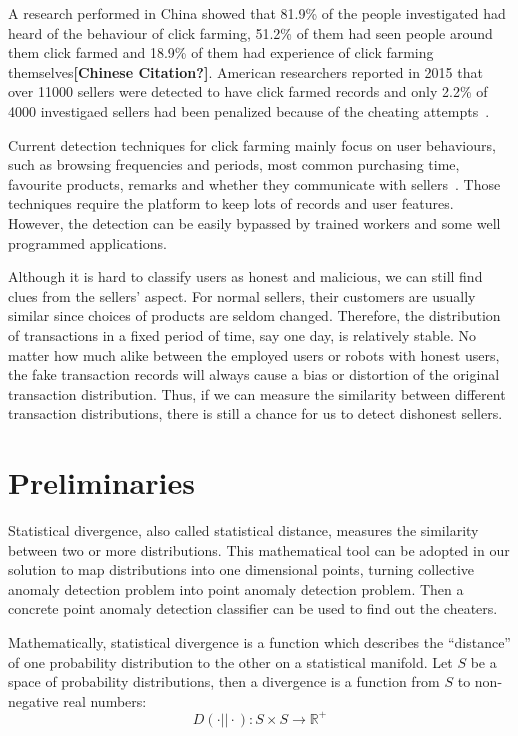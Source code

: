 \documentclass[a4paper]{IEEEtran}
\begin{document}
			A research performed in China showed that 81.9\% of the people investigated had heard of the behaviour of click farming, 51.2\% of them had seen people around them click farmed and 18.9\% of them had experience of click farming themselves\textbf{[Chinese Citation?]}. American researchers reported in 2015 that over 11000 sellers were detected to have click farmed records and only 2.2\% of 4000 investigaed sellers had been penalized because of the cheating attempts~\cite{netease2015research}.
			
			Current detection techniques for click farming mainly focus on user behaviours, such as browsing frequencies and periods, most common purchasing time, favourite products, remarks and whether they communicate with sellers~\cite{simpleDetection}. Those techniques require the platform to keep lots of records and user features. However, the detection can be easily bypassed by trained workers and some well programmed applications.
			
			Although it is hard to classify users as honest and malicious, we can still find clues from the sellers' aspect. For normal sellers, their customers are usually similar since choices of products are seldom changed. Therefore, the distribution of transactions in a fixed period of time, say one day, is relatively stable. No matter how much alike between the employed users or robots with honest users, the fake transaction records will always cause a bias or distortion of the original transaction distribution. Thus, if we can measure the similarity between different transaction distributions, there is still a chance for us to detect dishonest sellers.
			
	\section{Preliminaries}\label{sec:preliminaries}
		Statistical divergence, also called statistical distance, measures the similarity between two or more distributions. This mathematical tool can be adopted in our solution to map distributions into one dimensional points, turning collective anomaly detection problem into point anomaly detection problem. Then a concrete point anomaly detection classifier can be used to find out the cheaters.
		
		Mathematically, statistical divergence is a function which describes the ``distance'' of one probability distribution to the other on a statistical manifold. Let $S$ be a space of probability distributions, then a divergence is a function from $S$ to non-negative real numbers: 
		\begin{equation}
			D(\cdot || \cdot): S \times S \rightarrow \mathbb{R^+}
		\end{equation}
		
\end{document}
